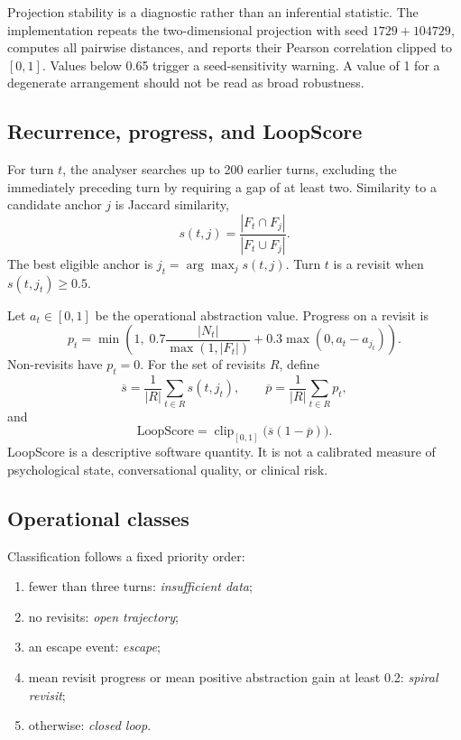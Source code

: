 \documentclass[11pt]{article}
\begin{document}
Projection stability is a diagnostic rather than an inferential statistic. The
implementation repeats the two-dimensional projection with seed
$1729+104729$, computes all pairwise distances, and reports their Pearson
correlation clipped to $[0,1]$. Values below 0.65 trigger a seed-sensitivity
warning. A value of 1 for a degenerate arrangement should not be read as broad
robustness.

\subsection{Recurrence, progress, and LoopScore}

For turn $t$, the analyser searches up to 200 earlier turns, excluding the
immediately preceding turn by requiring a gap of at least two. Similarity to a
candidate anchor $j$ is Jaccard similarity,
\begin{equation}
s(t,j)=\frac{|F_t\cap F_j|}{|F_t\cup F_j|}.
\end{equation}
The best eligible anchor is $j_t=\arg\max_j s(t,j)$. Turn $t$ is a revisit when
$s(t,j_t)\geq 0.5$.

Let $a_t\in[0,1]$ be the operational abstraction value. Progress on a revisit is
\begin{equation}
p_t=\min\left(1,\;0.7\frac{|N_t|}{\max(1,|F_t|)}+
0.3\max(0,a_t-a_{j_t})\right).
\end{equation}
Non-revisits have $p_t=0$. For the set of revisits $R$, define
\begin{equation}
\overline{s}=\frac{1}{|R|}\sum_{t\in R}s(t,j_t),\qquad
\overline{p}=\frac{1}{|R|}\sum_{t\in R}p_t,
\end{equation}
and
\begin{equation}
\mathrm{LoopScore}=\operatorname{clip}_{[0,1]}\bigl(\overline{s}(1-\overline{p})\bigr).
\end{equation}
LoopScore is a descriptive software quantity. It is not a calibrated measure of
psychological state, conversational quality, or clinical risk.

\subsection{Operational classes}

Classification follows a fixed priority order:

\begin{enumerate}
  \item fewer than three turns: \emph{insufficient data};
  \item no revisits: \emph{open trajectory};
  \item an escape event: \emph{escape};
  \item mean revisit progress or mean positive abstraction gain at least 0.2:
        \emph{spiral revisit};
  \item otherwise: \emph{closed loop}.
\end{enumerate}
\end{document}
